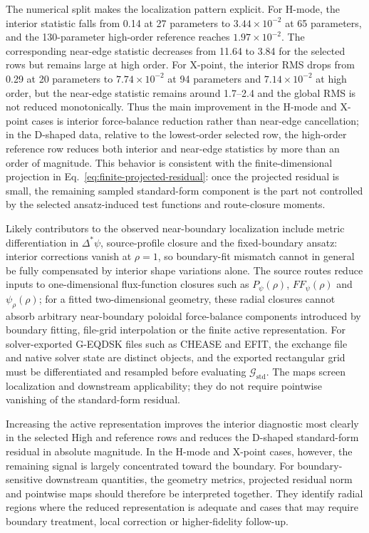 \documentclass[final, 3p, times]{elsarticle}
\begin{document}
The numerical split makes the localization pattern explicit. For H-mode, the interior statistic falls from 0.14 at 27 parameters to $3.44\times10^{-2}$ at 65 parameters, and the 130-parameter high-order reference reaches $1.97\times10^{-2}$. The corresponding near-edge statistic decreases from 11.64 to 3.84 for the selected rows but remains large at high order. For X-point, the interior RMS drops from 0.29 at 20 parameters to $7.74\times10^{-2}$ at 94 parameters and $7.14\times10^{-2}$ at high order, but the near-edge statistic remains around 1.7--2.4 and the global RMS is not reduced monotonically. Thus the main improvement in the H-mode and X-point cases is interior force-balance reduction rather than near-edge cancellation; in the D-shaped data, relative to the lowest-order selected row, the high-order reference row reduces both interior and near-edge statistics by more than an order of magnitude. This behavior is consistent with the finite-dimensional projection in Eq.~\eqref{eq:finite-projected-residual}: once the projected residual is small, the remaining sampled standard-form component is the part not controlled by the selected ansatz-induced test functions and route-closure moments.

Likely contributors to the observed near-boundary localization include metric differentiation in $\Delta^*\psi$, source-profile closure and the fixed-boundary ansatz: interior corrections vanish at $\rho=1$, so boundary-fit mismatch cannot in general be fully compensated by interior shape variations alone. The source routes reduce inputs to one-dimensional flux-function closures such as $P_\psi(\rho)$, $FF_\psi(\rho)$ and $\psi_\rho(\rho)$; for a fitted two-dimensional geometry, these radial closures cannot absorb arbitrary near-boundary poloidal force-balance components introduced by boundary fitting, file-grid interpolation or the finite active representation. For solver-exported G-EQDSK files such as CHEASE and EFIT, the exchange file and native solver state are distinct objects, and the exported rectangular grid must be differentiated and resampled before evaluating $\mathcal{G}_{\mathrm{std}}$. The maps screen localization and downstream applicability; they do not require pointwise vanishing of the standard-form residual.

Increasing the active representation improves the interior diagnostic most clearly in the selected High and reference rows and reduces the D-shaped standard-form residual in absolute magnitude. In the H-mode and X-point cases, however, the remaining signal is largely concentrated toward the boundary. For boundary-sensitive downstream quantities, the geometry metrics, projected residual norm and pointwise maps should therefore be interpreted together. They identify radial regions where the reduced representation is adequate and cases that may require boundary treatment, local correction or higher-fidelity follow-up.
\end{document}
